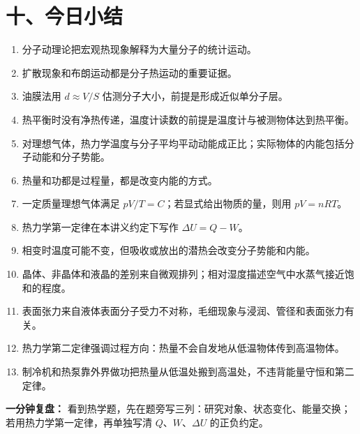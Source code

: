 \section*{十、今日小结}
\begin{enumerate}
  \item 分子动理论把宏观热现象解释为大量分子的统计运动。
  \item 扩散现象和布朗运动都是分子热运动的重要证据。
  \item 油膜法用 $d\approx V/S$ 估测分子大小，前提是形成近似单分子层。
  \item 热平衡时没有净热传递，温度计读数的前提是温度计与被测物体达到热平衡。
  \item 对理想气体，热力学温度与分子平均平动动能成正比；实际物体的内能包括分子动能和分子势能。
  \item 热量和功都是过程量，都是改变内能的方式。
  \item 一定质量理想气体满足 $pV/T=C$；若显式给出物质的量，则用 $pV=nRT$。
  \item 热力学第一定律在本讲义约定下写作 $\Delta U=Q-W$。
  \item 相变时温度可能不变，但吸收或放出的潜热会改变分子势能和内能。
  \item 晶体、非晶体和液晶的差别来自微观排列；相对湿度描述空气中水蒸气接近饱和的程度。
  \item 表面张力来自液体表面分子受力不对称，毛细现象与浸润、管径和表面张力有关。
  \item 热力学第二定律强调过程方向：热量不会自发地从低温物体传到高温物体。
  \item 制冷机和热泵靠外界做功把热量从低温处搬到高温处，不违背能量守恒和第二定律。
\end{enumerate}

\textbf{一分钟复盘：} 看到热学题，先在题旁写三列：研究对象、状态变化、能量交换；若用热力学第一定律，再单独写清 $Q$、$W$、$\Delta U$ 的正负约定。
